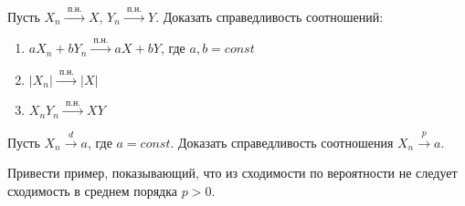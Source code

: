 


\begin{problem}
Пусть $X_n \overset{\text{ п.н. }}{\longrightarrow} X$, $Y_n \overset{\text{ п.н. }}{\longrightarrow} Y$. Доказать справедливость соотношений:
\begin{enumerate}
\item $a X_n + b Y_n \overset{\text{ п.н. }}{\longrightarrow} a X + b Y$, где  $a, b = const$
\item $|X_n| \overset{\text{ п.н. }}{\longrightarrow} |X|$
\item $X_n Y_n \overset{\text{ п.н. }}{\longrightarrow} XY$
\end{enumerate}

\end{problem}

\begin{problem}
Пусть $X_n \overset{d}{\longrightarrow} a$, где $a = const$. Доказать справедливость соотношения $X_n \overset{p}{\longrightarrow} a$.
\end{problem}

\begin{problem}
Привести пример, показывающий, что из сходимости по вероятности не следует сходимость в среднем порядка $p > 0$.
\end{problem}



